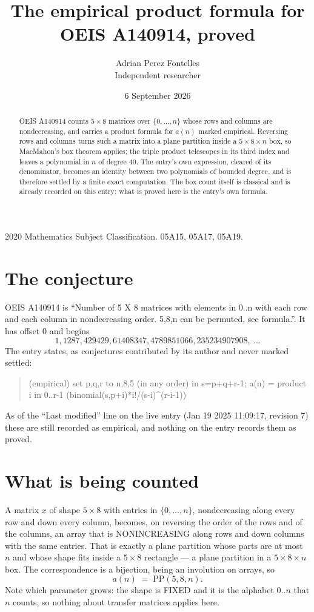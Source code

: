 \documentclass[11pt,a4paper]{article}
\title{The empirical product formula for OEIS A140914, proved}
\author{Adrian Perez Fontelles\\ \small Independent researcher}
\date{6 September 2026}
\theoremstyle{plain}
\theoremstyle{definition}
\begin{document}
\maketitle

\begin{abstract}
OEIS A140914 counts $5\times8$ matrices over $\{0,\dots,n\}$ whose rows and columns are
nondecreasing, and carries a product formula for $a(n)$ marked empirical. Reversing rows and
columns turns such a matrix into a plane partition inside a $5\times8\times n$ box, so
MacMahon's box theorem applies; the triple product telescopes in its third index and leaves a
polynomial in $n$ of degree $40$. The entry's own expression, cleared of its denominator,
becomes an identity between two polynomials of bounded degree, and is therefore settled by a
finite exact computation. The box count itself is classical and is already recorded on this
entry; what is proved here is the entry's own formula.
\end{abstract}

\noindent\small 2020 Mathematics Subject Classification. 05A15, 05A17, 05A19.\normalsize

\section{The conjecture}

OEIS A140914 is ``Number of 5 X 8 matrices with elements in 0..n with each row and each column in nondecreasing order. 5,8,n can be permuted, see formula.''. It has offset $0$ and begins
\[
1, 1287, 429429, 61408347, 4789851066, 235234907908,\ \dots
\]
The entry states, as conjectures contributed by its author and never marked settled:
\begin{quote}
(empirical) set p,q,r to n,8,5 (in any order) in s=p+q+r-1; a(n) = product {i in 0..r-1} (binomial(s,p+i)*i!/(s-i)\^{}(r-i-1))

\end{quote}
As of the ``Last modified'' line on the live entry (Jan 19 2025 11:09:17, revision 7) these are still
recorded as empirical, and nothing on the entry records them as proved.

\section{What is being counted}

A matrix $x$ of shape $5\times8$ with entries in $\{0,\dots,n\}$, nondecreasing along
every row and down every column, becomes, on reversing the order of the rows and of the
columns, an array that is NONINCREASING along rows and down columns with the same entries. That
is exactly a plane partition whose parts are at most $n$ and whose shape fits inside a
$5\times8$ rectangle --- a plane partition in a $5\times8\times n$ box. The
correspondence is a bijection, being an involution on arrays, so
\[
a(n)\;=\;\mathrm{PP}(5,8,n).
\]
Note which parameter grows: the shape is FIXED and it is the alphabet $0..n$ that $n$ counts,
so nothing about transfer matrices applies here.
\end{document}
